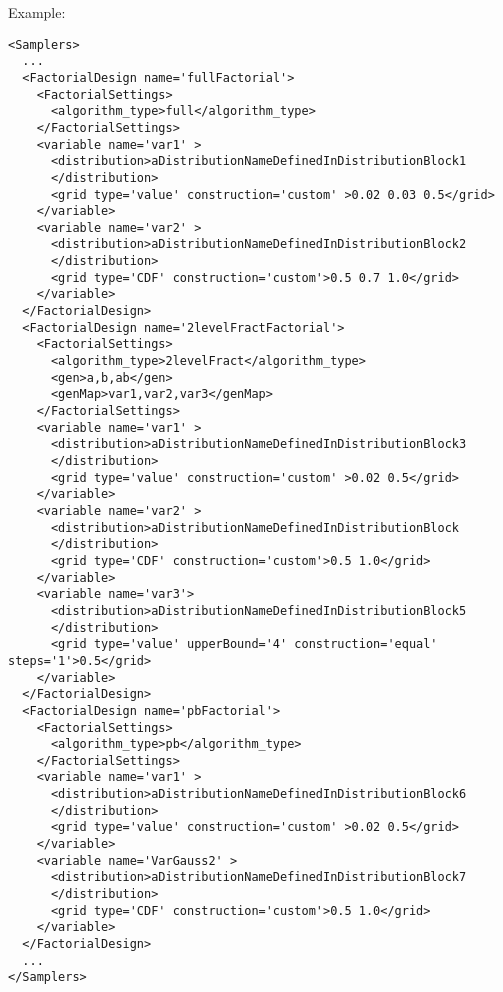 Example:
\begin{lstlisting}[style=XML,morekeywords={construction,upperBound,steps}]
<Samplers>
  ...
  <FactorialDesign name='fullFactorial'>
    <FactorialSettings>
      <algorithm_type>full</algorithm_type>
    </FactorialSettings>
    <variable name='var1' >
      <distribution>aDistributionNameDefinedInDistributionBlock1
      </distribution> 
      <grid type='value' construction='custom' >0.02 0.03 0.5</grid>
    </variable>
    <variable name='var2' >
      <distribution>aDistributionNameDefinedInDistributionBlock2
      </distribution> 
      <grid type='CDF' construction='custom'>0.5 0.7 1.0</grid>
    </variable>
  </FactorialDesign>
  <FactorialDesign name='2levelFractFactorial'>
    <FactorialSettings>
      <algorithm_type>2levelFract</algorithm_type>
      <gen>a,b,ab</gen>
      <genMap>var1,var2,var3</genMap>
    </FactorialSettings>
    <variable name='var1' >
      <distribution>aDistributionNameDefinedInDistributionBlock3
      </distribution> 
      <grid type='value' construction='custom' >0.02 0.5</grid>
    </variable>
    <variable name='var2' >
      <distribution>aDistributionNameDefinedInDistributionBlock
      </distribution> 
      <grid type='CDF' construction='custom'>0.5 1.0</grid>
    </variable>
    <variable name='var3'>
      <distribution>aDistributionNameDefinedInDistributionBlock5
      </distribution> 
      <grid type='value' upperBound='4' construction='equal' steps='1'>0.5</grid>
    </variable>
  </FactorialDesign>
  <FactorialDesign name='pbFactorial'>
    <FactorialSettings>
      <algorithm_type>pb</algorithm_type>
    </FactorialSettings>
    <variable name='var1' >
      <distribution>aDistributionNameDefinedInDistributionBlock6
      </distribution> 
      <grid type='value' construction='custom' >0.02 0.5</grid>
    </variable>
    <variable name='VarGauss2' >
      <distribution>aDistributionNameDefinedInDistributionBlock7
      </distribution> 
      <grid type='CDF' construction='custom'>0.5 1.0</grid>
    </variable>
  </FactorialDesign>
  ...
</Samplers>
\end{lstlisting}

